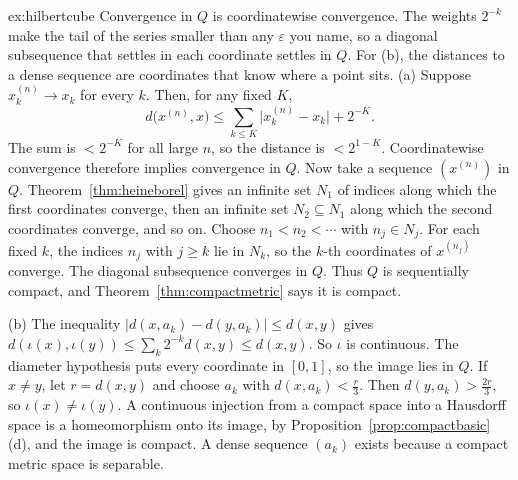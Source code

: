 \begin{solution}{ex:hilbertcube}
\idea Convergence in $Q$ is coordinatewise convergence. The weights $2^{-k}$ make the tail of the series smaller than any $\varepsilon$ you name, so a diagonal subsequence that settles in each coordinate settles in $Q$. For (b), the distances to a dense sequence are coordinates that know where a point sits.
\writeup (a) Suppose $x^{(n)}_k\to x_k$ for every $k$. Then, for any fixed $K$,
\[d\bigl(x^{(n)},x\bigr)\le\sum_{k\le K}\bigl|x^{(n)}_k-x_k\bigr|+2^{-K}.\]
The sum is $<2^{-K}$ for all large $n$, so the distance is $<2^{1-K}$. Coordinatewise convergence therefore implies convergence in $Q$. Now take a sequence $(x^{(n)})$ in $Q$. Theorem~\ref{thm:heineborel} gives an infinite set $N_1$ of indices along which the first coordinates converge, then an infinite set $N_2\subseteq N_1$ along which the second coordinates converge, and so on. Choose $n_1<n_2<\cdots$ with $n_j\in N_j$. For each fixed $k$, the indices $n_j$ with $j\ge k$ lie in $N_k$, so the $k$-th coordinates of $x^{(n_j)}$ converge. The diagonal subsequence converges in $Q$. Thus $Q$ is sequentially compact, and Theorem~\ref{thm:compactmetric} says it is compact.

(b) The inequality $|d(x,a_k)-d(y,a_k)|\le d(x,y)$ gives $d(\iota(x),\iota(y))\le\sum_k 2^{-k}d(x,y)\le d(x,y)$. So $\iota$ is continuous. The diameter hypothesis puts every coordinate in $[0,1]$, so the image lies in $Q$. If $x\ne y$, let $r=d(x,y)$ and choose $a_k$ with $d(x,a_k)<\frac r3$. Then $d(y,a_k)>\frac{2r}3$, so $\iota(x)\ne\iota(y)$. A continuous injection from a compact space into a Hausdorff space is a homeomorphism onto its image, by Proposition~\ref{prop:compactbasic}(d), and the image is compact. A dense sequence $(a_k)$ exists because a compact metric space is separable.
\end{solution}

